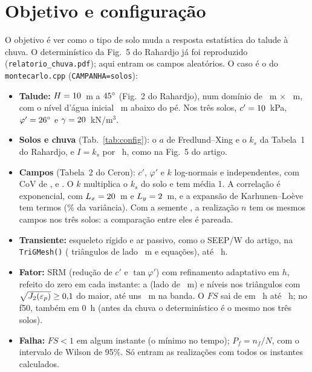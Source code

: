 \documentclass[11pt,a4paper]{article}
\begin{document}
\section{Objetivo e configuração}\label{sec:config}
O objetivo é ver como o tipo de solo muda a resposta estatística do talude à chuva. O determinístico da Fig.~5 do
Rahardjo já foi reproduzido (\texttt{relatorio\_chuva.pdf}); aqui entram os campos aleatórios. O caso é o do
\texttt{montecarlo.cpp} (\texttt{CAMPANHA=solos}):
\begin{itemize}
\item \textbf{Talude:} $H = 10$~m a $45^\circ$ (Fig.~2 do Rahardjo), num domínio de \DomX~m $\times$
\DomY~m, com o nível d'água inicial \Hw~m abaixo do pé. Nos três solos, $c' = 10$~kPa, $\varphi' = 26^\circ$
e $\gamma = 20$~kN/m$^3$.
\item \textbf{Solos e chuva} (Tab.~\ref{tab:config}): o $a$ de Fredlund--Xing e o $k_s$ da Tabela~1 do Rahardjo, e
$I = k_s$ por \Chuva~h, como na Fig.~5 do artigo.
\item \textbf{Campos} (Tabela~2 do Ceron): $c'$, $\varphi'$ e $k$ log-normais e independentes, com CoV de \CovC,
\CovPhi{} e \CovK. O $k$ multiplica o $k_s$ do solo e tem média 1. A correlação é exponencial, com $L_x = 20$~m e
$L_y = 2$~m, e a expansão de Karhunen--Loève tem \KLM{} termos (\KLvar\% da variância). Com a semente \Semente, a
realização $n$ tem os mesmos campos nos três solos: a comparação entre eles é pareada.
\item \textbf{Transiente:} esqueleto rígido e ar passivo, como o SEEP/W do artigo, na \texttt{TriGMesh(\RefMC)}
(\TriTrans{} triângulos de lado \LadoTrans~m e \EqTrans{} equações), até \Fim~h.
\item \textbf{Fator:} SRM (redução de $c'$ e $\tan\varphi'$) com refinamento adaptativo em $h$, refeito do zero em cada
instante: a \texttt{\MalhaF} (lado de \LadoFator~m) e \Nref{} níveis nos triângulos com
$\sqrt{J_2(\varepsilon_p)} \geq 0{,}1$ do maior, até uns \LadoBanda~m na banda. O $FS$ sai de \Passo{} em
\Passo~h até \Fim~h; no f50, também em 0~h (antes da chuva o determinístico é o mesmo nos três solos).
\item \textbf{Falha:} $FS < 1$ em algum instante (o mínimo no tempo); $P_f = n_f/N$, com o intervalo de Wilson de 95\%.
Só entram as realizações com todos os instantes calculados.
\end{itemize}
\end{document}
